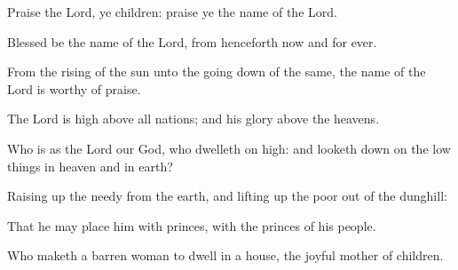 \item Praise the Lord, ye children: praise ye the name of the Lord.
\item Blessed be the name of the Lord, from henceforth now and for ever.
\item From the rising of the sun unto the going down of the same, the name of the Lord is worthy of praise.
\item The Lord is high above all nations; and his glory above the heavens.
\item Who is as the Lord our God, who dwelleth on high: and looketh down on the low things in heaven and in earth?
\item Raising up the needy from the earth, and lifting up the poor out of the dunghill:
\item That he may place him with princes, with the princes of his people.
\item Who maketh a barren woman to dwell in a house, the joyful mother of children.